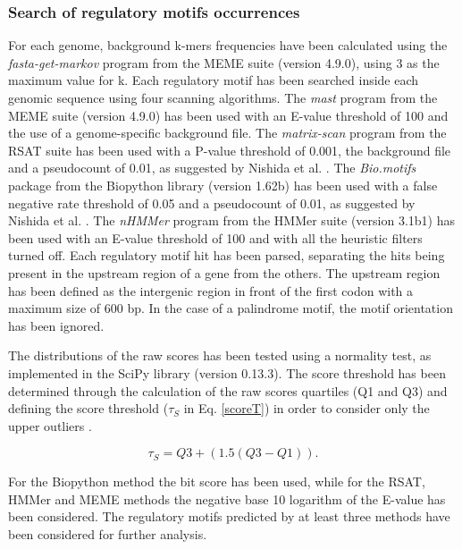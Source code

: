 \subsubsection{Search of regulatory motifs occurrences}
For each genome, background k-mers frequencies have been calculated using the \textit{fasta-get-markov} program from the MEME suite (version 4.9.0)\cite{bailey2009meme}, using 3 as the maximum value for k.
Each regulatory motif has been searched inside each genomic sequence using four scanning algorithms. The \textit{mast} program from the MEME suite (version 4.9.0)\cite{bailey2009meme} has been used with an E-value threshold of 100 and the use of a genome-specific background file. The \textit{matrix-scan} program from the RSAT suite \cite{van2003regulatory, thomas2008rsat, thomas2011rsat} has been used with a P-value threshold of 0.001, the background file and a pseudocount of 0.01, as suggested by Nishida et al. \cite{nishida2009pseudocounts}. The \textit{Bio.motifs} package from the Biopython library (version 1.62b)\cite{cock2009biopython} has been used with a false negative rate threshold of 0.05 and a pseudocount of 0.01, as suggested by Nishida et al. \cite{nishida2009pseudocounts}. The \textit{nHMMer} program from the HMMer suite (version 3.1b1)\cite{eddy2009new, johnson2010hidden, eddy2011accelerated} has been used with an E-value threshold of 100 and with all the heuristic filters turned off.
Each regulatory motif hit has been parsed, separating the hits being present in the upstream region of a gene from the others. The upstream region has been defined as the intergenic region in front of the first codon with a maximum size of 600 bp. In the case of a palindrome motif, the motif orientation has been ignored.

The distributions of the raw scores has been tested using a normality test, as implemented in the SciPy library (version 0.13.3)\cite{d1971omnibus}\cite{jones2001scipy}. The score threshold has been determined through the calculation of the raw scores quartiles (Q1 and Q3) and defining the score threshold ($\tau_S$ in Eq. \ref{scoreT}) in order to consider only the upper outliers \cite{hojo1931distribution}.

\begin{equation}
\label{scoreT}
\tau_S= Q3 + (1.5 (Q3-Q1)).
\end{equation}


For the Biopython method the bit score has been used, while for the RSAT, HMMer and MEME methods the negative base 10 logarithm of the E-value has been considered. The regulatory motifs predicted by at least three methods have been considered for further analysis. 

